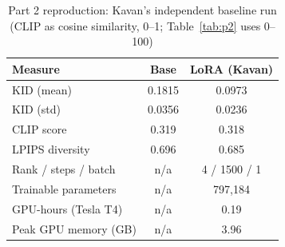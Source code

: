 \begin{table}[!t]
\centering
\footnotesize
\setlength{\tabcolsep}{4pt}
\caption{Part 2 reproduction: Kavan's independent baseline run (CLIP as cosine similarity, 0--1; Table~\ref{tab:p2} uses 0--100)}
\label{tab:p2repro}
\begin{tabular}{lcc}
\toprule
Measure & Base & LoRA (Kavan) \\
\midrule
KID (mean) & 0.1815 & 0.0973 \\
KID (std) & 0.0356 & 0.0236 \\
CLIP score & 0.319 & 0.318 \\
LPIPS diversity & 0.696 & 0.685 \\
Rank / steps / batch & n/a & 4 / 1500 / 1 \\
Trainable parameters & n/a & 797{,}184 \\
GPU-hours (Tesla T4) & n/a & 0.19 \\
Peak GPU memory (GB) & n/a & 3.96 \\
\bottomrule
\end{tabular}
\end{table}
